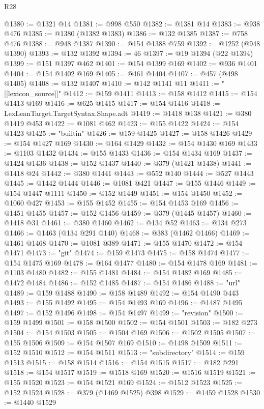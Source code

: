 \begin{lexlean}{R28}
\begin{coremodule}
@1380 := @1321 @14
@1381 := @998 @550
@1382 := @1381 @14
@1383 := @938 @476
@1385 := @1380 (@1382 @1383)
@1386 := @132 @1385
@1387 := @758 @476
@1388 := @948 @1387
@1390 := @154 @1388 @759
@1392 := @1252 (@948 @1390)
@1393 := @132 @1392
@1394 := 46
@1397 := @19 @1394 (@22 @1394)
@1399 := @151 @1397 @462
@1401 := @154 @1399 @169
@1402 := @936 @1401
@1404 := @154 @1402 @169
@1405 := @461 @1404
@1407 := @457 (@498 @1405)
@1408 := @132 @1407
@1410 := @142 @1141 @11
@1411 := "[[lexicon_source]]"
@1412 := @159 @1411
@1413 := @158 @1412
@1415 := @154 @1413 @169
@1416 := @625 @1415
@1417 := @154 @1416
@1418 := LexLeanTarget.TargetSyntax.Shape.adt
@1419 := @1418 @138
@1421 := @380 @1419 @453
@1422 := @1081 @462
@1423 := @155 @1422
@1424 := @154 @1423
@1425 := "builtin"
@1426 := @159 @1425
@1427 := @158 @1426
@1429 := @154 @1427 @169
@1430 := @164 @1429
@1432 := @154 @1430 @169
@1433 := @1103 @1432
@1434 := @155 @1433
@1436 := @154 @1434 @169
@1437 := @1424 @1436
@1438 := @152 @1437
@1440 := @379 (@1421 @1438)
@1441 := @1418 @24
@1442 := @380 @1441
@1443 := @552 @140
@1444 := @527 @1443
@1445 := @1442 @1444
@1446 := @1081 @421
@1447 := @155 @1446
@1449 := @154 @1447 @1111
@1450 := @152 @1449
@1451 := @154 @1450
@1452 := @1060 @427
@1453 := @155 @1452
@1455 := @154 @1453 @169
@1456 := @1451 @1455
@1457 := @152 @1456
@1459 := @379 (@1445 @1457)
@1460 := @1418 @31
@1461 := @380 @1460
@1462 := @134 @52
@1463 := @134 @273
@1466 := @1463 (@134 @291 @140)
@1468 := @383 (@1462 @1466)
@1469 := @1461 @1468
@1470 := @1081 @389
@1471 := @155 @1470
@1472 := @154 @1471
@1473 := "git"
@1474 := @159 @1473
@1475 := @158 @1474
@1477 := @154 @1475 @169
@1478 := @164 @1477
@1480 := @154 @1478 @169
@1481 := @1103 @1480
@1482 := @155 @1481
@1484 := @154 @1482 @169
@1485 := @1472 @1484
@1486 := @152 @1485
@1487 := @154 @1486
@1488 := "url"
@1489 := @159 @1488
@1490 := @158 @1489
@1492 := @154 @1490 @443
@1493 := @155 @1492
@1495 := @154 @1493 @169
@1496 := @1487 @1495
@1497 := @152 @1496
@1498 := @154 @1497
@1499 := "revision"
@1500 := @159 @1499
@1501 := @158 @1500
@1502 := @154 @1501
@1503 := @182 @273
@1504 := @154 @1503
@1505 := @1504 @169
@1506 := @1502 @1505
@1507 := @155 @1506
@1509 := @154 @1507 @169
@1510 := @1498 @1509
@1511 := @152 @1510
@1512 := @154 @1511
@1513 := "subdirectory"
@1514 := @159 @1513
@1515 := @158 @1514
@1516 := @154 @1515
@1517 := @182 @291
@1518 := @154 @1517
@1519 := @1518 @169
@1520 := @1516 @1519
@1521 := @155 @1520
@1523 := @154 @1521 @169
@1524 := @1512 @1523
@1525 := @152 @1524
@1528 := @379 (@1469 @1525) @398
@1529 := @1459 @1528
@1530 := @1440 @1529

\end{coremodule}
\end{lexlean}
